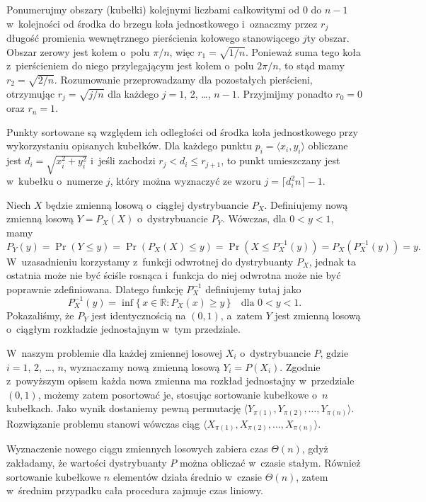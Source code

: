 Ponumerujmy obszary (kubełki) kolejnymi liczbami całkowitymi od 0 do $n-1$ w~kolejności od środka do brzegu koła jednostkowego i~oznaczmy przez $r_j$ długość promienia wewnętrznego pierścienia kołowego stanowiącego $j$\nbhyphen ty obszar.
Obszar zerowy jest kołem o~polu $\pi/n$, więc $r_1=\sqrt{1/n}$.
Ponieważ suma tego koła z~pierścieniem do niego przylegającym jest kołem o~polu $2\pi/n$, to stąd mamy $r_2=\sqrt{2/n}$.
Rozumowanie przeprowadzamy dla pozostałych pierścieni, otrzymując $r_j=\sqrt{j/n}$ dla każdego $j=1$, 2, \dots, $n-1$.
Przyjmijmy ponadto $r_0=0$ oraz $r_n=1$.

Punkty sortowane są względem ich odległości od środka koła jednostkowego przy wykorzystaniu opisanych kubełków.
Dla każdego punktu $p_i=\langle x_i,y_i\rangle$ obliczane jest $d_i=\sqrt{x_i^2+y_i^2}$ i~jeśli zachodzi $r_j<d_i\le r_{j+1}$, to punkt umieszczany jest w~kubełku o~numerze $j$, który można wyznaczyć ze wzoru $j=\lceil d_i^2n\rceil-1$.

\exercise %
Niech $X$ będzie zmienną losową o~ciągłej dystrybuancie $P_X$.
Definiujemy nową zmienną losową $Y=P_X(X)$ o~dystrybuancie $P_Y$.
Wówczas, dla $0<y<1$, mamy
\[
    P_Y(y) = \Pr(Y\le y) = \Pr(P_X(X)\le y) = \Pr(X\le P_X^{-1}(y)) = P_X(P_X^{-1}(y)) = y.
\]
W~uzasadnieniu korzystamy z~funkcji odwrotnej do dystrybuanty $P_X$, jednak ta ostatnia może nie być ściśle rosnąca i~funkcja do niej odwrotna może nie być poprawnie zdefiniowana.
Dlatego funkcję $P_X^{-1}$ definiujemy tutaj jako
\[
	P_X^{-1}(y) = \inf\{\,x\in\mathbb{R}:P_X(x)\ge y\,\} \quad\text{dla $0<y<1$}.
\]
Pokazaliśmy, że $P_Y$ jest identycznością na $(0,1)$, a~zatem $Y$ jest zmienną losową o~ciągłym rozkładzie jednostajnym w~tym przedziale.

W~naszym problemie dla każdej zmiennej losowej $X_i$ o~dystrybuancie $P$, gdzie $i=1$, 2, \dots, $n$, wyznaczamy nową zmienną losową $Y_i=P(X_i)$.
Zgodnie z~powyższym opisem każda nowa zmienna ma rozkład jednostajny w~przedziale $(0,1)$, możemy zatem posortować je, stosując sortowanie kubełkowe o~$n$ kubełkach.
Jako wynik dostaniemy pewną permutację $\langle Y_{\pi(1)},Y_{\pi(2)},\dots,Y_{\pi(n)}\rangle$.
Rozwiązanie problemu stanowi wówczas ciąg $\langle X_{\pi(1)},X_{\pi(2)},\dots,X_{\pi(n)}\rangle$.

Wyznaczenie nowego ciągu zmiennych losowych zabiera czas $\Theta(n)$, gdyż zakładamy, że wartości dystrybuanty $P$ można obliczać w~czasie stałym.
Również sortowanie kubełkowe $n$ elementów działa średnio w~czasie $\Theta(n)$, zatem w~średnim przypadku cała procedura zajmuje czas liniowy.
